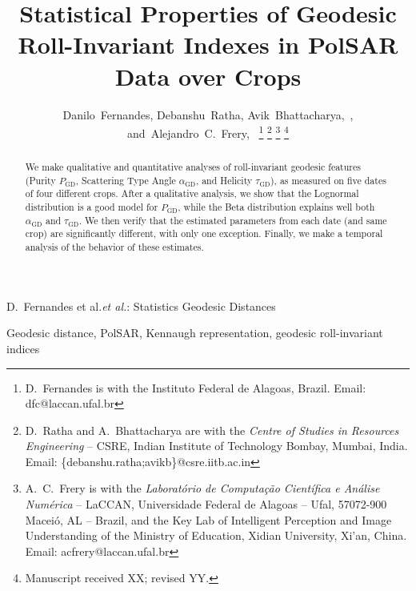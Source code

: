 \documentclass[journal]{IEEEtran}
\begin{document}
	
	\title{Statistical Properties of Geodesic Roll-Invariant Indexes in PolSAR Data over Crops}
	
	\author{Danilo~Fernandes,
		Debanshu~Ratha,
		Avik~Bhattacharya,~,
		and~Alejandro~C.~Frery,~%
		\thanks{D.\ Fernandes is with the Instituto Federal de Alagoas, Brazil. Email: dfc@laccan.ufal.br}%
		\thanks{D.\ Ratha and A.\ Bhattacharya are with the \textit{Centre of Studies in Resources Engineering}
			-- CSRE, Indian Institute of Technology Bombay, Mumbai, India. Email: \{debanshu.ratha;avikb\}@csre.iitb.ac.in}%
		\thanks{A.\ C.\ Frery is with the \textit{Laborat\'orio de Computa\c c\~ao Cient\'ifica e An\'alise Num\'erica} -- LaCCAN, 
			Universidade Federal de Alagoas -- Ufal, 
			57072-900 Macei\'o, AL -- Brazil, and the Key Lab of Intelligent Perception and Image Understanding of the Ministry of Education, Xidian University, Xi'an, China. Email: acfrery@laccan.ufal.br}
		\thanks{Manuscript received XX; revised YY.}}
	
	{D.\ Fernandes et al.\MakeLowercase{\textit{et al.}}: Statistics Geodesic Distances}
	
	\maketitle
	
	\begin{abstract}
		We make qualitative and quantitative analyses of roll-invariant geodesic features (Purity $P_{\text{GD}}$, Scattering Type Angle $\alpha_{\text{GD}}$, and Helicity $\tau_{\text{GD}}$), as measured on five dates of four different crops.
		After a qualitative analysis, we show that the Lognormal distribution is a good model for $P_{\text{GD}}$, while the Beta distribution explains well both $\alpha_{\text{GD}}$ and $\tau_{\text{GD}}$.
		We then verify that the estimated parameters from each date (and same crop) are significantly different, with only one exception.
		Finally, we make a temporal analysis of the behavior of these estimates.
	\end{abstract}
	
	\begin{IEEEkeywords}
		Geodesic distance, PolSAR, Kennaugh representation, geodesic roll-invariant indices
	\end{IEEEkeywords}
	
\end{document}

